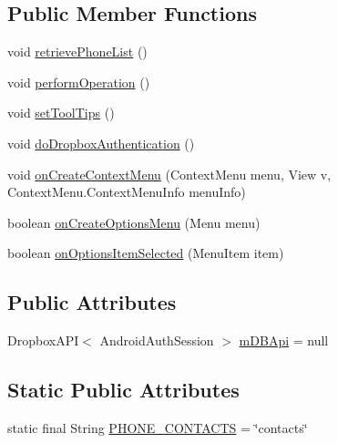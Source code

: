 \subsection*{Public Member Functions}
\begin{DoxyCompactItemize}
\item 
void \hyperlink{classcourse_1_1examples_1_1phoneapp_1_1_ops_activity_a4483070d81483a14c450c03a23521b33}{retrieve\+Phone\+List} ()
\item 
void \hyperlink{classcourse_1_1examples_1_1phoneapp_1_1_ops_activity_a427848e2c42eb538b888f8b7214b8cd4}{perform\+Operation} ()
\item 
void \hyperlink{classcourse_1_1examples_1_1phoneapp_1_1_ops_activity_a55825f56d10a878fc5516121f0eda3bf}{set\+Tool\+Tips} ()
\item 
void \hyperlink{classcourse_1_1examples_1_1phoneapp_1_1_ops_activity_ae6f21dd987eba779e66e4bb66bbee391}{do\+Dropbox\+Authentication} ()
\item 
void \hyperlink{classcourse_1_1examples_1_1phoneapp_1_1_ops_activity_a329fad70246e569c6746b7a38f35e6e6}{on\+Create\+Context\+Menu} (Context\+Menu menu, View v, Context\+Menu.\+Context\+Menu\+Info menu\+Info)
\item 
boolean \hyperlink{classcourse_1_1examples_1_1phoneapp_1_1_ops_activity_a1c9753b2bbe4cf6d37c17f3a97df304b}{on\+Create\+Options\+Menu} (Menu menu)
\item 
boolean \hyperlink{classcourse_1_1examples_1_1phoneapp_1_1_ops_activity_a6175dfaf6290e9c3a13da40e5ef61e60}{on\+Options\+Item\+Selected} (Menu\+Item item)
\end{DoxyCompactItemize}
\subsection*{Public Attributes}
\begin{DoxyCompactItemize}
\item 
Dropbox\+A\+P\+I$<$ Android\+Auth\+Session $>$ \hyperlink{classcourse_1_1examples_1_1phoneapp_1_1_ops_activity_afa9dcbfe8d531688656b8ee3042ccba6}{m\+D\+B\+Api} = null
\end{DoxyCompactItemize}
\subsection*{Static Public Attributes}
\begin{DoxyCompactItemize}
\item 
static final String \hyperlink{classcourse_1_1examples_1_1phoneapp_1_1_ops_activity_a6bbe27893d347a4f66c9bac0e2dcc80b}{P\+H\+O\+N\+E\+\_\+\+C\+O\+N\+T\+A\+C\+T\+S} = \char`\"{}contacts\char`\"{}
\end{DoxyCompactItemize}
